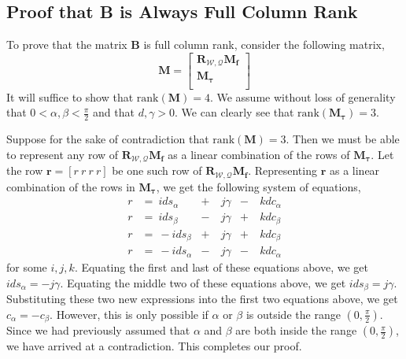 \subsection{Proof that B is Always Full Column Rank}
\label{sec:ch2:rank}

To prove that the matrix $\mathbf{B}$ is full column rank, consider the following matrix,
%
\begin{equation}
\mathbf{M} = 
\begin{bmatrix}
\mathbf{R}_{\mathcal{W},\mathcal{Q}} \mathbf{M}_{\mathbf{f}} \\
\mathbf{M}_{\mathbf{\tau}}                                   \\
\end{bmatrix}
\end{equation}
%
It will suffice to show that $\mathrm{rank}(\mathbf{M})=4$.
We assume without loss of generality that $0 < \alpha, \beta < \frac{\pi}{2}$ and that $d,\gamma > 0$.
We can clearly see that $\mathrm{rank}(\mathbf{M}_{\mathbf{\tau}})=3$.

Suppose for the sake of contradiction that $\mathrm{rank}(\mathbf{M})=3$.
Then we must be able to represent any row of $\mathbf{R}_{\mathcal{W},\mathcal{Q}} \mathbf{M}_{\mathbf{f}}$ as a linear combination of the rows of $\mathbf{M}_{\mathbf{\tau}}$.
Let the row $\mathbf{r} =[r ~ r ~ r ~ r]$ be one such row of $\mathbf{R}_{\mathcal{W},\mathcal{Q}} \mathbf{M}_{\mathbf{f}}$.
Representing $\mathbf{r}$ as a linear combination of the rows in $\mathbf{M}_{\mathbf{\tau}}$, we get the following system of equations,
%
\begin{equation}
\begin{aligned}
r & = ~   i ds_{\alpha} & + & ~ j \gamma & - & ~ k dc_{\alpha} \\
r & = ~   i ds_{\beta}  & - & ~ j \gamma & + & ~ k dc_{\beta}  \\
r & = ~ - i ds_{\beta}  & + & ~ j \gamma & + & ~ k dc_{\beta}  \\
r & = ~ - i ds_{\alpha} & - & ~ j \gamma & - & ~ k dc_{\alpha}
\end{aligned}
\end{equation}
%
for some $i,j,k$.
Equating the first and last of these equations above, we get $i ds_{\alpha} = - j \gamma $.
Equating the middle two of these equations above, we get $i ds_{\beta} =  j \gamma $.
Substituting these two new expressions into the first two equations above, we get $c_{\alpha} = - c_{\beta}$.
However, this is only possible if $\alpha$ or $\beta$ is outside the range $(0,\frac{\pi}{2})$.
Since we had previously assumed that $\alpha$ and $\beta$ are both inside the range $(0,\frac{\pi}{2})$, we have arrived at a contradiction.
This completes our proof.



% 
% 

% 



